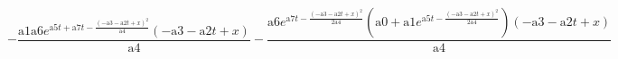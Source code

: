 \documentclass{article}
\begin{document}
\[-\frac{\text{a1} \text{a6} e^{\text{a5} t+\text{a7} t-\frac{(-\text{a3}-\text{a2} t+x)^2}{\text{a4}}} (-\text{a3}-\text{a2} t+x)}{\text{a4}}-\frac{\text{a6}
e^{\text{a7} t-\frac{(-\text{a3}-\text{a2} t+x)^2}{2 \text{a4}}} \left(\text{a0}+\text{a1} e^{\text{a5} t-\frac{(-\text{a3}-\text{a2} t+x)^2}{2 \text{a4}}}\right)
(-\text{a3}-\text{a2} t+x)}{\text{a4}}\]
\end{document}
